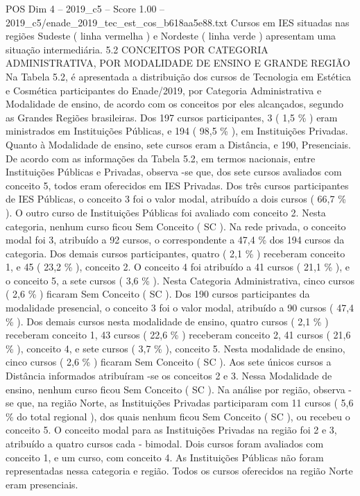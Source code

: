 \begin{textsample}{POS Dim 4 – 2019\_c5 – Score 1.00 – 2019\_c5/enade\_2019\_tec\_est\_cos\_b618aa5e88.txt}
Cursos em IES situadas nas regiões Sudeste ( linha vermelha ) e Nordeste ( linha verde ) apresentam uma situação intermediária. 5.2 CONCEITOS POR CATEGORIA ADMINISTRATIVA, POR MODALIDADE DE ENSINO E GRANDE REGIÃO Na Tabela 5.2, é apresentada a distribuição dos cursos de Tecnologia em Estética e Cosmética participantes do Enade/2019, por Categoria Administrativa e Modalidade de ensino, de acordo com os conceitos por eles alcançados, segundo as Grandes Regiões brasileiras.
Dos 197 cursos participantes, 3 ( 1,5 \% ) eram ministrados em Instituições Públicas, e 194 ( 98,5 \% ), em Instituições Privadas.
Quanto à Modalidade de ensino, sete cursos eram a Distância, e 190, Presenciais.
De acordo com as informações da Tabela 5.2, em termos nacionais, entre Instituições Públicas e Privadas, observa -se que, dos sete cursos avaliados com conceito 5, todos eram oferecidos em IES Privadas.
Dos três cursos participantes de IES Públicas, o conceito 3 foi o valor modal, atribuído a dois cursos ( 66,7 \% ).
O outro curso de Instituições Públicas foi avaliado com conceito 2.
Nesta categoria, nenhum curso ficou Sem Conceito ( SC ).
Na rede privada, o conceito modal foi 3, atribuído a 92 cursos, o correspondente a 47,4 \% dos 194 cursos da categoria.
Dos demais cursos participantes, quatro ( 2,1 \% ) receberam conceito 1, e 45 ( 23,2 \% ), conceito 2.
O conceito 4 foi atribuído a 41 cursos ( 21,1 \% ), e o conceito 5, a sete cursos ( 3,6 \% ).
Nesta Categoria Administrativa, cinco cursos ( 2,6 \% ) ficaram Sem Conceito ( SC ).
Dos 190 cursos participantes da modalidade presencial, o conceito 3 foi o valor modal, atribuído a 90 cursos ( 47,4 \% ).
Dos demais cursos nesta modalidade de ensino, quatro cursos ( 2,1 \% ) receberam conceito 1, 43 cursos ( 22,6 \% ) receberam conceito 2, 41 cursos ( 21,6 \% ), conceito 4, e sete cursos ( 3,7 \% ), conceito 5.
Nesta modalidade de ensino, cinco cursos ( 2,6 \% ) ficaram Sem Conceito ( SC ).
Aos sete únicos cursos a Distância informados atribuíram -se os conceitos 2 e 3.
Nessa Modalidade de ensino, nenhum curso ficou Sem Conceito ( SC ).
Na análise por região, observa -se que, na região Norte, as Instituições Privadas participaram com 11 cursos ( 5,6 \% do total regional ), dos quais nenhum ficou Sem Conceito ( SC ), ou recebeu o conceito 5.
O conceito modal para as Instituições Privadas na região foi 2 e 3, atribuído a quatro cursos cada - bimodal.
Dois cursos foram avaliados com conceito 1, e um curso, com conceito 4.
As Instituições Públicas não foram representadas nessa categoria e região.
Todos os cursos oferecidos na região Norte eram presenciais.

\end{textsample}
